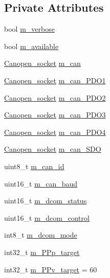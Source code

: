 \subsection*{Private Attributes}
\begin{DoxyCompactItemize}
\item 
bool \hyperlink{class_l_x_m32_a844f338bcaeb9315011d1775a7334221}{m\+\_\+verbose}
\item 
bool \hyperlink{class_l_x_m32_a474f3670b392536b81dcfc202212bcb8}{m\+\_\+available}
\item 
\hyperlink{class_canopen__socket}{Canopen\+\_\+socket} \hyperlink{class_l_x_m32_a345b56ded3041759e3741b75a1391211}{m\+\_\+can}
\item 
\hyperlink{class_canopen__socket}{Canopen\+\_\+socket} \hyperlink{class_l_x_m32_ae6fc61b6cbd9e5033b6503f8946ed9c5}{m\+\_\+can\+\_\+\+P\+D\+O1}
\item 
\hyperlink{class_canopen__socket}{Canopen\+\_\+socket} \hyperlink{class_l_x_m32_a784c0204ddd0f063c4bcd243ac2533a1}{m\+\_\+can\+\_\+\+P\+D\+O2}
\item 
\hyperlink{class_canopen__socket}{Canopen\+\_\+socket} \hyperlink{class_l_x_m32_a8e25c227aaf76a0dfd89a9936ad667bd}{m\+\_\+can\+\_\+\+P\+D\+O3}
\item 
\hyperlink{class_canopen__socket}{Canopen\+\_\+socket} \hyperlink{class_l_x_m32_a856973a186284f33da9be2a4a585305c}{m\+\_\+can\+\_\+\+P\+D\+O4}
\item 
\hyperlink{class_canopen__socket}{Canopen\+\_\+socket} \hyperlink{class_l_x_m32_a7861b906134f87686198df5ae72edc68}{m\+\_\+can\+\_\+\+S\+DO}
\item 
uint8\+\_\+t \hyperlink{class_l_x_m32_ab304270d7912f8e237ed6c36fa8c96c3}{m\+\_\+can\+\_\+id}
\item 
uint16\+\_\+t \hyperlink{class_l_x_m32_adb622f21fcda644210c1479a0dbab4e3}{m\+\_\+can\+\_\+baud}
\item 
uint16\+\_\+t \hyperlink{class_l_x_m32_ac741ce060b7c1360ddde954f37b6465f}{m\+\_\+dcom\+\_\+status}
\item 
uint16\+\_\+t \hyperlink{class_l_x_m32_a574b8c11cd3333b00204f49d96ca91b3}{m\+\_\+dcom\+\_\+control}
\item 
int8\+\_\+t \hyperlink{class_l_x_m32_a5ce08e07c7b719bf655501ea7c32743c}{m\+\_\+dcom\+\_\+mode}
\item 
int32\+\_\+t \hyperlink{class_l_x_m32_a749dc73f0c0ea8dda195ed4874830ed2}{m\+\_\+\+P\+Pp\+\_\+target}
\item 
int32\+\_\+t \hyperlink{class_l_x_m32_a849cddf9b1d4f658a8fda818f071c721}{m\+\_\+\+P\+Pv\+\_\+target} = 60

\end{DoxyCompactItemize}
